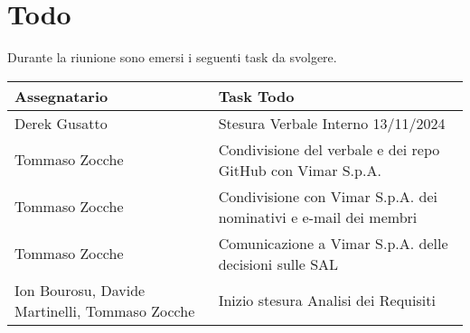 \section{Todo}
Durante la riunione sono emersi i seguenti task da svolgere.

\begin{center}
  \begin{tabular}{|p{5cm}|p{8cm}|}
    \hline
    \textbf{Assegnatario}       & \textbf{Task Todo} \\ 
    \hline
    Derek Gusatto   &  Stesura Verbale Interno 13/11/2024\\ \hline
     Tommaso Zocche  & Condivisione del verbale e dei repo GitHub con Vimar S.p.A. \\ \hline
     Tommaso Zocche  & Condivisione con Vimar S.p.A. dei nominativi e e-mail dei membri \\ \hline
     Tommaso Zocche  & Comunicazione a Vimar S.p.A. delle decisioni sulle SAL \\ \hline
     Ion Bourosu, Davide Martinelli, Tommaso Zocche  & Inizio stesura Analisi dei Requisiti\\ \hline
  \end{tabular}
\end{center}